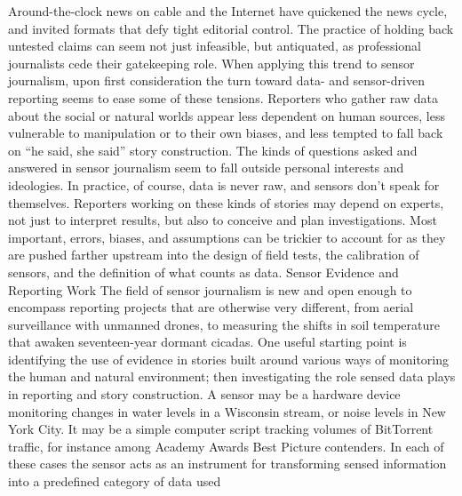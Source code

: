Around-the-clock news on cable and the Internet have quickened the news
cycle, and invited formats that defy tight editorial control. The practice of
holding back untested claims can seem not just infeasible, but antiquated,
as professional journalists cede their gatekeeping role.
When applying this trend to sensor journalism, upon first consideration the
turn toward data- and sensor-driven reporting seems to ease some of these
tensions. Reporters who gather raw data about the social or natural worlds
appear less dependent on human sources, less vulnerable to manipulation
or to their own biases, and less tempted to fall back on ``he said, she said''
story construction. The kinds of questions asked and answered in sensor
journalism seem to fall outside personal interests and ideologies. In practice,
of course, data is never raw, and sensors don't speak for themselves.
Reporters working on these kinds of stories may depend on experts, not
just to interpret results, but also to conceive and plan investigations. Most
important, errors, biases, and assumptions can be trickier to account for as
they are pushed farther upstream into the design of field tests, the calibration
of sensors, and the definition of what counts as data.
Sensor Evidence and Reporting Work
The field of sensor journalism is new and open enough to encompass
reporting projects that are otherwise very different, from aerial surveillance
with unmanned drones, to measuring the shifts in soil temperature that
awaken seventeen-year dormant cicadas. One useful starting point is identifying
the use of evidence in stories built around various ways of monitoring
the human and natural environment; then investigating the role sensed
data plays in reporting and story construction. A sensor may be a hardware
device monitoring changes in water levels in a Wisconsin stream, or noise
levels in New York City. It may be a simple computer script tracking volumes
of BitTorrent traffic, for instance among Academy Awards Best Picture
contenders. In each of these cases the sensor acts as an instrument for
transforming sensed information into a predefined category of data used

